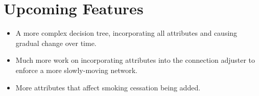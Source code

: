 \documentclass[]{article}
\begin{document}
\section{Upcoming Features}
\begin{itemize}
\item A more complex decision tree, incorporating all attributes and causing gradual change over time.
\item Much more work on incorporating attributes into the connection adjuster to enforce a more slowly-moving network.
\item More attributes that affect smoking cessation being added.
\end{itemize}
\end{document}

